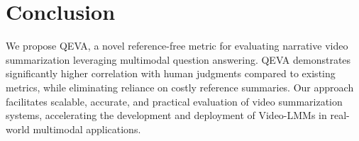 \section{Conclusion}
\label{sec:conclusion}

We propose QEVA, a novel reference-free metric for evaluating narrative video summarization leveraging multimodal question answering. 
QEVA demonstrates significantly higher correlation with human judgments compared to existing metrics, while eliminating reliance on costly reference summaries. 
Our approach facilitates scalable, accurate, and practical evaluation of video summarization systems, accelerating the development and deployment of Video-LMMs in real-world multimodal applications.